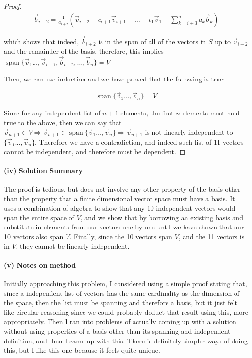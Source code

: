 \documentclass{article}
\DeclareMathOperator{\spn}{span}
\begin{document}
\begin{proof}
\begin{align*}
\vec{b}_{i+2} = \frac{1}{a_{i+2}}(\vec{v}_{i+2} - c_{i+1} \vec{v}_{i+1} - \ldots - c_1 \vec{v}_1 - \sum_{k=i+3}^{n} a_k \vec{b}_k)
\end{align*}

which shows that indeed, $\vec{b}_{i+2}$ is in the span of all of the vectors in $S$ up to $\vec{v}_{i+2}$ and the remainder of the basis, therefore, this implies $\spn{\{ \vec{v}_1 \ldots, \vec{v}_{i+1} , \vec{b}_{i+2}, \ldots, \vec{b}_n \}}=V$

Then, we can use induction and we have proved that the following is true:

\begin{align*}
\spn{\{ \vec{v}_1 \ldots, \vec{v}_{n} \}} = V
\end{align*}

Since for any independent list of $n+1$ elements, the first $n$ elements must hold true to the above, then we can say that $\vec{v}_{n+1} \in V \Rightarrow \vec{v}_{n+1} \in \spn{\{ \vec{v}_1 \ldots, \vec{v}_{n} \}} \Rightarrow \vec{v}_{n+1}$ is not linearly independent to $\{ \vec{v}_1 \ldots, \vec{v}_{n} \}$. Therefore we have a contradiction, and indeed such list of $11$ vectors cannot be independent, and therefore must be dependent.


\end{proof}

\paragraph{(iv) Solution Summary}

The proof is tedious, but does not involve any other property of the basis other than the property that a finite dimensional vector space must have a basis. It uses a combination of algebra to show that any 10 independent vectors would span the entire space of $V$, and we show that by borrowing an existing basis and substitute in elements from our vectors one by one until we have shown that our 10 vectors also span $V$. Finally, since the 10 vectors span $V$, and the 11 vectors is in $V$, they cannot be linearly independent.

\paragraph{(v) Notes on method}
Initially approaching this problem, I considered using a simple proof stating that, since a independent list of vectors has the same cardinality as the dimension of the space, then the list must be spanning and therefore a basis, but it just felt like circular reasoning since we could probably deduct that result using this, more appropriately. Then I ran into problems of actually coming up with a solution without using properties of a basis other than its spanning and independent definition, and then I came up with this. There is definitely simpler ways of doing this, but I like this one because it feels quite unique.
\end{document}

